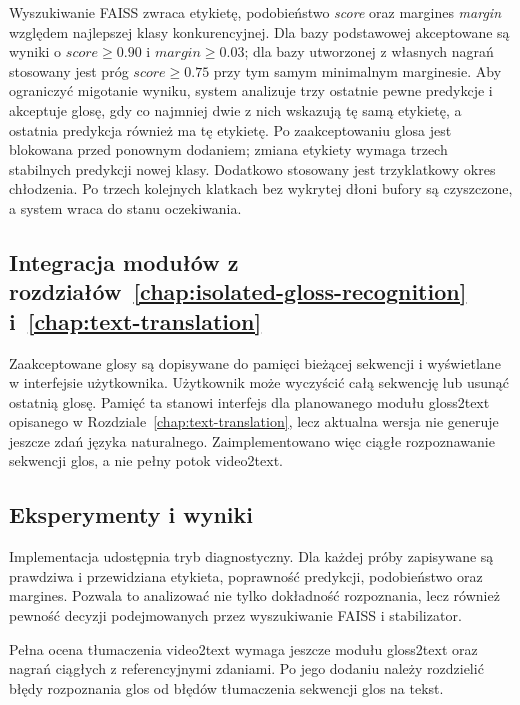 Wyszukiwanie FAISS zwraca etykietę, podobieństwo \emph{score} oraz margines
\emph{margin} względem najlepszej klasy konkurencyjnej. Dla bazy podstawowej
akceptowane są wyniki o $score \geq 0.90$ i $margin \geq 0.03$; dla bazy
utworzonej z własnych nagrań stosowany jest próg $score \geq 0.75$ przy tym
samym minimalnym marginesie. Aby ograniczyć migotanie wyniku, system analizuje
trzy ostatnie pewne predykcje i akceptuje glosę, gdy co najmniej dwie z nich
wskazują tę samą etykietę, a ostatnia predykcja również ma tę etykietę.
Po zaakceptowaniu glosa jest blokowana przed ponownym dodaniem; zmiana etykiety
wymaga trzech stabilnych predykcji nowej klasy. Dodatkowo stosowany jest
trzyklatkowy okres chłodzenia. Po trzech kolejnych klatkach bez wykrytej dłoni
bufory są czyszczone, a system wraca do stanu oczekiwania.

\subsection{Integracja modułów z rozdziałów~\ref{chap:isolated-gloss-recognition} i~\ref{chap:text-translation}}
\label{sec:sentence-level-integration}

Zaakceptowane glosy są dopisywane do pamięci bieżącej sekwencji i wyświetlane
w interfejsie użytkownika. Użytkownik może wyczyścić całą sekwencję lub usunąć
ostatnią glosę. Pamięć ta stanowi interfejs dla planowanego modułu gloss2text
opisanego w Rozdziale~\ref{chap:text-translation}, lecz aktualna wersja nie
generuje jeszcze zdań języka naturalnego. Zaimplementowano więc ciągłe
rozpoznawanie sekwencji glos, a nie pełny potok video2text.

\subsection{Eksperymenty i wyniki}
\label{sec:sentence-level-experiments}

Implementacja udostępnia tryb diagnostyczny. Dla każdej próby zapisywane są
prawdziwa i przewidziana etykieta, poprawność predykcji, podobieństwo oraz
margines. Pozwala to analizować nie tylko dokładność rozpoznania, lecz również
pewność decyzji podejmowanych przez wyszukiwanie FAISS i stabilizator.

Pełna ocena tłumaczenia video2text wymaga jeszcze modułu gloss2text oraz
nagrań ciągłych z referencyjnymi zdaniami. Po jego dodaniu należy rozdzielić
błędy rozpoznania glos od błędów tłumaczenia sekwencji glos na tekst.